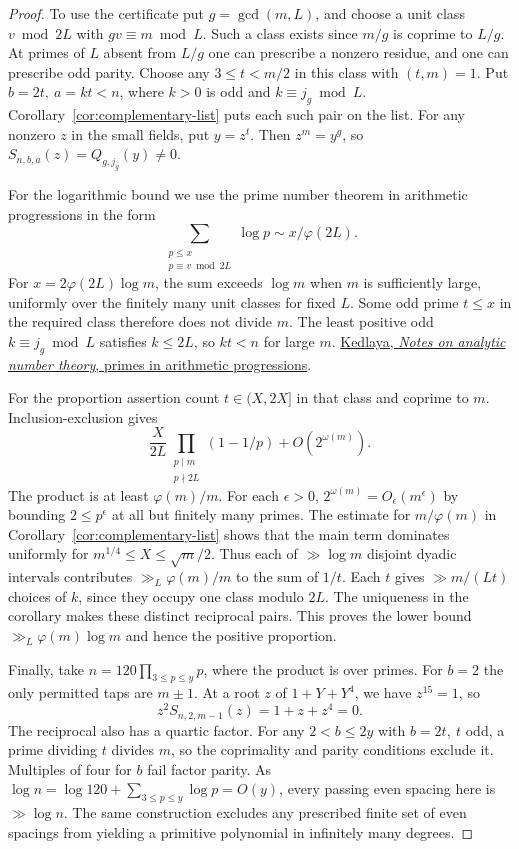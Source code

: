 \documentclass[11pt]{article}
\begin{document}
\begin{proof}
To use the certificate put \(g=\gcd(m,L)\), and choose a unit class
\(v\bmod 2L\) with \(gv\equiv m\bmod L\). Such a class exists since
\(m/g\) is coprime to \(L/g\). At primes of \(L\) absent from \(L/g\)
one can prescribe a nonzero residue, and one can prescribe odd parity.
Choose any \(3\le t<m/2\) in this class with \((t,m)=1\).
Put \(b=2t,\ a=kt<n\), where \(k>0\) is odd and \(k\equiv j_g\bmod L\).
Corollary~\ref{cor:complementary-list} puts each such pair on the list.
For any nonzero \(z\) in the small fields, put \(y=z^t\).
Then \(z^m=y^g\), so \(S_{n,b,a}(z)=Q_{g,j_g}(y)\ne0\).

For the logarithmic bound we use the prime number theorem in arithmetic
progressions in the form
\[
 \sum_{\substack{p\le x\\p\equiv v\bmod 2L}}\log p\sim x/\varphi(2L).
\]
For \(x=2\varphi(2L)\log m\), the sum exceeds \(\log m\)
when \(m\) is sufficiently large, uniformly over the finitely many
unit classes for fixed \(L\). Some odd prime \(t\le x\) in the
required class therefore does not divide \(m\). The least positive
odd \(k\equiv j_g\bmod L\) satisfies \(k\le2L\), so \(kt<n\)
for large \(m\).
\href{https://kskedlaya.org/ant/chap-primes-in-ap.html}{Kedlaya,
\emph{Notes on analytic number theory}, primes in arithmetic progressions}.

For the proportion assertion count \(t\in(X,2X]\) in that class
and coprime to \(m\). Inclusion-exclusion gives
\[
 \frac{X}{2L}\prod_{\substack{p\mid m\\p\nmid 2L}}(1-1/p)
          +O(2^{\omega(m)}).
\]
The product is at least \(\varphi(m)/m\).
For each \(\epsilon>0\), \(2^{\omega(m)}=O_\epsilon(m^\epsilon)\)
by bounding \(2\le p^\epsilon\) at all but finitely many primes.
The estimate for \(m/\varphi(m)\) in
Corollary~\ref{cor:complementary-list} shows that the main term
dominates uniformly for \(m^{1/4}\le X\le\sqrt m/2\). Thus each of
\(\gg\log m\) disjoint dyadic intervals contributes
\(\gg_L\varphi(m)/m\) to the sum of \(1/t\). Each \(t\) gives
\(\gg m/(Lt)\) choices of \(k\), since they occupy one class modulo
\(2L\). The uniqueness in the corollary makes these distinct reciprocal
pairs. This proves the lower bound \(\gg_L\varphi(m)\log m\) and hence
the positive proportion.

Finally, take \(n=120\prod_{3\le p\le y}p\), where the product is
over primes. For \(b=2\) the only permitted taps are \(m\pm1\).
At a root \(z\) of \(1+Y+Y^4\), we have \(z^{15}=1\), so
\[
 z^2 S_{n,2,m-1}(z)=1+z+z^4=0.
\]
The reciprocal also has a quartic factor. For any \(2<b\le2y\)
with \(b=2t,\ t\) odd, a prime dividing \(t\) divides \(m\),
so the coprimality and parity conditions exclude it. Multiples of
four for \(b\) fail factor parity. As
\(\log n=\log120+\sum_{3\le p\le y}\log p=O(y)\), every passing
even spacing here is \(\gg\log n\). The same construction excludes
any prescribed finite set of even spacings from yielding a primitive
polynomial in infinitely many degrees.
\end{proof}
\end{document}
